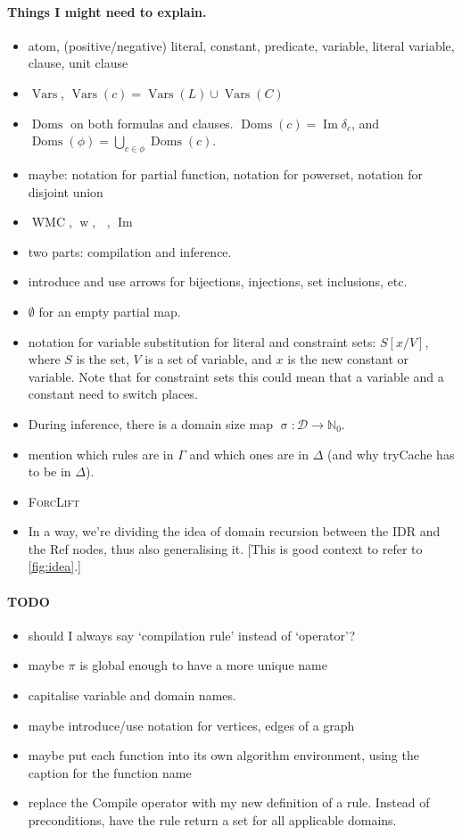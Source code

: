 \documentclass{article}
\theoremstyle{definition}
\theoremstyle{remark}
\DeclareMathOperator{\wwp}{w}
\DeclareMathOperator{\wwn}{\overline{w}}
\DeclareMathOperator{\Imm}{Im}
\DeclareMathOperator{\Doms}{Doms}
\DeclareMathOperator{\size}{\sigma}
\DeclareMathOperator{\Vars}{Vars}
\DeclareMathOperator{\WMC}{WMC}
\begin{document}
\paragraph{Things I might need to explain.}
\begin{itemize}
\item atom, (positive/negative) literal, constant, predicate, variable, literal variable, clause, unit clause
\item $\Vars$, $\Vars(c) = \Vars(L) \cup \Vars(C)$
\item $\Doms$ on both formulas and clauses. $\Doms(c) = \Imm \delta_c$, and $\Doms(\phi) = \bigcup_{c \in \phi} \Doms(c)$.
\item maybe: notation for partial function, notation for powerset, notation for disjoint union
\item $\WMC$, $\wwp$, $\wwn$, $\Imm$
\item two parts: compilation and inference.
\item introduce and use arrows for bijections, injections, set inclusions, etc.
\item $\emptyset$ for an empty partial map.
\item notation for variable substitution for literal and constraint sets: $S[x/V]$, where $S$ is the set, $V$ is a set of variable, and $x$ is the new constant or variable. Note that for constraint sets this could mean that a variable and a constant need to switch places.
\item During inference, there is a domain size map $\size\colon \mathcal{D} \to \mathbb{N}_0$.
\item mention which rules are in $\Gamma$ and which ones are in $\Delta$ (and why tryCache has to be in $\Delta$).
\item \textsc{ForcLift}
\item In a way, we're dividing the idea of domain recursion between the IDR and the Ref nodes, thus also generalising it. [This is good context to refer to \cref{fig:idea}.]
\end{itemize}

\paragraph{TODO}
\begin{itemize}
\item should I always say `compilation rule' instead of `operator'?
\item maybe $\pi$ is global enough to have a more unique name
\item capitalise variable and domain names.
\item maybe introduce/use notation for vertices, edges of a graph
\item maybe put each function into its own algorithm environment, using the caption for the function name
\item replace the Compile operator with my new definition of a rule. Instead of preconditions, have the rule return a set for all applicable domains.
\end{itemize}
\end{document}
